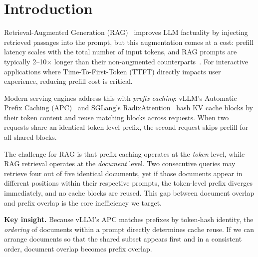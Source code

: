 \documentclass{article}
\begin{document}
\printAffiliationsAndNotice{\mlsysEqualContribution}

\section{Introduction}
\label{sec:intro}

Retrieval-Augmented Generation (RAG)~\citep{lewis2020rag} improves LLM factuality by injecting retrieved passages into the prompt, but this augmentation comes at a cost: prefill latency scales with the total number of input tokens, and RAG prompts are typically 2--10$\times$ longer than their non-augmented counterparts~\citep{gao2024ragsurvey}. For interactive applications where Time-To-First-Token (TTFT) directly impacts user experience, reducing prefill cost is critical.

Modern serving engines address this with \emph{prefix caching}: vLLM's Automatic Prefix Caching (APC)~\citep{kwon2023pagedattention} and SGLang's RadixAttention~\citep{zheng2024sglang} hash KV cache blocks by their token content and reuse matching blocks across requests. When two requests share an identical token-level prefix, the second request skips prefill for all shared blocks.

The challenge for RAG is that prefix caching operates at the \emph{token} level, while RAG retrieval operates at the \emph{document} level. Two consecutive queries may retrieve four out of five identical documents, yet if those documents appear in different positions within their respective prompts, the token-level prefix diverges immediately, and no cache blocks are reused. This gap between document overlap and prefix overlap is the core inefficiency we target.

\textbf{Key insight.}  Because vLLM's APC matches prefixes by token-hash identity, the \emph{ordering} of documents within a prompt directly determines cache reuse. If we can arrange documents so that the shared subset appears first and in a consistent order, document overlap becomes prefix overlap.
\end{document}
